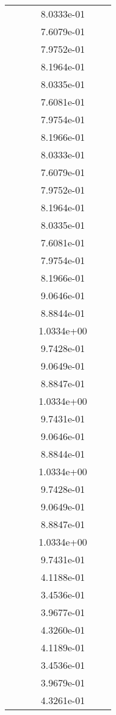\begin{xltabular}{\textwidth}{r|rS[table-format=1.3e+2]S[table-format=1.4e+2]S[table-format=1.4e+2]S[table-format=-1.5]}
&  &  & 8.0333e-01 & & \\
&  &  & 7.6079e-01 & & \\
&  &  & 7.9752e-01 & & \\
&  &  & 8.1964e-01 & & \\
&  &  & 8.0335e-01 & & \\
&  &  & 7.6081e-01 & & \\
&  &  & 7.9754e-01 & & \\
&  &  & 8.1966e-01 & & \\
&  &  & 8.0333e-01 & & \\
&  &  & 7.6079e-01 & & \\
&  &  & 7.9752e-01 & & \\
&  &  & 8.1964e-01 & & \\
&  &  & 8.0335e-01 & & \\
&  &  & 7.6081e-01 & & \\
&  &  & 7.9754e-01 & & \\
&  &  & 8.1966e-01 & & \\
&  &  & 9.0646e-01 & & \\
&  &  & 8.8844e-01 & & \\
&  &  & 1.0334e+00 & & \\
&  &  & 9.7428e-01 & & \\
&  &  & 9.0649e-01 & & \\
&  &  & 8.8847e-01 & & \\
&  &  & 1.0334e+00 & & \\
&  &  & 9.7431e-01 & & \\
&  &  & 9.0646e-01 & & \\
&  &  & 8.8844e-01 & & \\
&  &  & 1.0334e+00 & & \\
&  &  & 9.7428e-01 & & \\
&  &  & 9.0649e-01 & & \\
&  &  & 8.8847e-01 & & \\
&  &  & 1.0334e+00 & & \\
&  &  & 9.7431e-01 & & \\
&  &  & 4.1188e-01 & & \\
&  &  & 3.4536e-01 & & \\
&  &  & 3.9677e-01 & & \\
&  &  & 4.3260e-01 & & \\
&  &  & 4.1189e-01 & & \\
&  &  & 3.4536e-01 & & \\
&  &  & 3.9679e-01 & & \\
&  &  & 4.3261e-01 & & \\

\end{xltabular}
